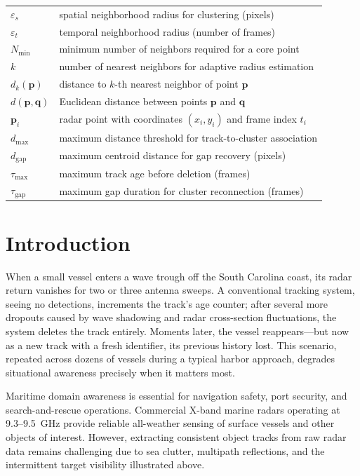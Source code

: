 \documentclass[conf]{new-aiaa}
\begin{document}
{\renewcommand\arraystretch{1.0}
\noindent\begin{longtable*}{@{}l @{\quad=\quad} l@{}}
$\varepsilon_s$ & spatial neighborhood radius for clustering (pixels) \\
$\varepsilon_t$ & temporal neighborhood radius (number of frames) \\
$N_{\min}$ & minimum number of neighbors required for a core point \\
$k$ & number of nearest neighbors for adaptive radius estimation \\
$d_k(\mathbf{p})$ & distance to $k$-th nearest neighbor of point $\mathbf{p}$ \\
$d(\mathbf{p}, \mathbf{q})$ & Euclidean distance between points $\mathbf{p}$ and $\mathbf{q}$ \\
$\mathbf{p}_i$ & radar point with coordinates $(x_i, y_i)$ and frame index $t_i$ \\
$d_{\max}$ & maximum distance threshold for track-to-cluster association \\
$d_{\text{gap}}$ & maximum centroid distance for gap recovery (pixels) \\
$\tau_{\max}$ & maximum track age before deletion (frames) \\
$\tau_{\text{gap}}$ & maximum gap duration for cluster reconnection (frames)
\end{longtable*}}

\section{Introduction}

When a small vessel enters a wave trough off the South Carolina coast, its radar return vanishes for two or three antenna sweeps. A conventional tracking system, seeing no detections, increments the track's age counter; after several more dropouts caused by wave shadowing and radar cross-section fluctuations, the system deletes the track entirely. Moments later, the vessel reappears---but now as a new track with a fresh identifier, its previous history lost. This scenario, repeated across dozens of vessels during a typical harbor approach, degrades situational awareness precisely when it matters most.

Maritime domain awareness is essential for navigation safety, port security, and search-and-rescue operations. Commercial X-band marine radars operating at 9.3--9.5~GHz provide reliable all-weather sensing of surface vessels and other objects of interest. However, extracting consistent object tracks from raw radar data remains challenging due to sea clutter, multipath reflections, and the intermittent target visibility illustrated above.
\end{document}
